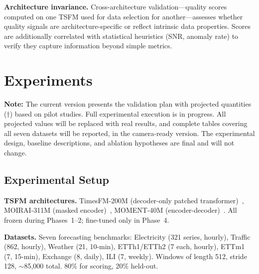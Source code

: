 \documentclass{article}
\begin{document}
\textbf{Architecture invariance.} Cross-architecture validation---quality scores computed on one TSFM used for data selection for another---assesses whether quality signals are architecture-specific or reflect intrinsic data properties. Scores are additionally correlated with statistical heuristics (SNR, anomaly rate) to verify they capture information beyond simple metrics.

\section{Experiments}

\label{sec:experiments}

\textbf{Note:} The current version presents the validation plan with projected quantities ($\dagger$) based on pilot studies. Full experimental execution is in progress. All projected values will be replaced with real results, and complete tables covering all seven datasets will be reported, in the camera-ready version. The experimental design, baseline descriptions, and ablation hypotheses are final and will not change.

\subsection{Experimental Setup}

\textbf{TSFM architectures.} TimesFM-200M (decoder-only patched transformer)~\citep{das2024timesfm}, MOIRAI-311M (masked encoder)~\citep{woo2024moirai}, MOMENT-40M (encoder-decoder)~\citep{goswami2024moment}. All frozen during Phases~1--2; fine-tuned only in Phase~4.

\textbf{Datasets.} Seven forecasting benchmarks: Electricity (321 series, hourly), Traffic (862, hourly), Weather (21, 10-min), ETTh1/ETTh2 (7 each, hourly), ETTm1 (7, 15-min), Exchange (8, daily), ILI (7, weekly). Windows of length 512, stride 128, $\sim$85,000 total. 80\% for scoring, 20\% held-out.
\end{document}
